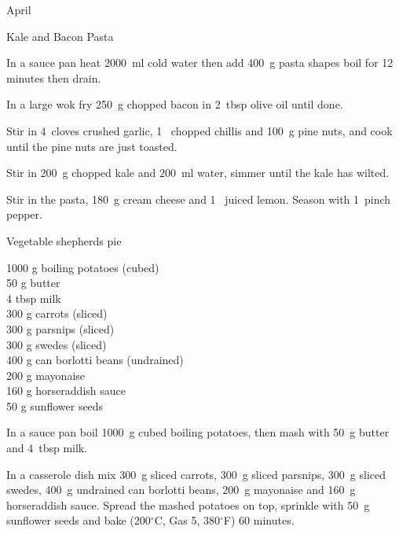 \begin{menu}{April}
\begin{recipe}{2}{Kale and Bacon Pasta}
\begin{ingredients}
		\end{ingredients}
	
    \begin{instructions}
    \item 
      In a sauce pan heat
      2000~ml  cold water then add
      400~g  pasta shapes
      boil for 12
      minutes then drain.
    \item 
        In a large wok fry
        250~g chopped bacon
        in
        2~tbsp  olive oil
        until done.
      \item 
        Stir in
        4~cloves crushed garlic,
        1~ chopped chillis
        and
        100~g  pine nuts,
        and cook until the pine nuts are just toasted.
      \item 
        Stir in
        200~g chopped kale
        and
        200~ml  water,
        simmer until the kale has wilted.
      \item 
        Stir in the pasta,
        180~g  cream cheese
        and
        1~ juiced lemon.
        Season with
        1~pinch  pepper.
      
    \end{instructions}
    \end{recipe}%
  
    \begin{recipe}{2}{Vegetable shepherds pie}%
    
		\begin{ingredients}
		1000 g boiling potatoes (cubed) \\
	50 g butter  \\
	4 tbsp milk  \\
	300 g carrots (sliced) \\
	300 g parsnips (sliced) \\
	300 g swedes (sliced) \\
	400 g can borlotti beans (undrained) \\
	200 g mayonaise  \\
	160 g horseraddish sauce  \\
	50 g sunflower seeds  \\
	
		\end{ingredients}
	
	
    \begin{instructions}
    \item 
        In a sauce pan boil
        1000~g cubed boiling potatoes,
        then mash with
        50~g  butter
        and
        4~tbsp  milk.
      \item 
        In a casserole dish mix
        300~g sliced carrots,
        300~g sliced parsnips,
        300~g sliced swedes,
        400~g undrained can borlotti beans,
        200~g  mayonaise
        and
        160~g  horseraddish sauce.
        Spread the mashed potatoes on top,
        sprinkle with
        50~g  sunflower seeds
        and
        bake 
      (200$^{\circ}$C, Gas 5, 380$^{\circ}$F)
     60 minutes.
      

\end{instructions}
\end{recipe}
\end{menu}

